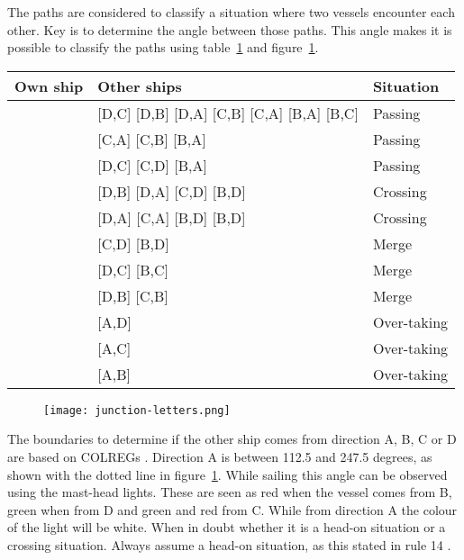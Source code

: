 The paths are considered to classify a situation where two vessels encounter each other. Key is to determine the angle between those paths. This angle makes it is possible to classify the paths using table~\ref{tab:scenarios-standard} and figure~\ref{fig:junction-letters}.

\begin{table}[p]
	\centering
	\begin{tabular}{l|l|l}
		Own ship & Other ships & Situation\\
		\hline
		\big[A,D\big] & [D,C] [D,B] [D,A] [C,B] [C,A] [B,A] [B,C] & Passing \\
		\big[A,C\big] & [C,A] [C,B] [B,A] & Passing \\
		\big[A,B\big] & [D,C] [C,D] [B,A] & Passing \\
		\big[A,C\big] & [D,B] [D,A] [C,D] [B,D] & Crossing \\
		\big[A,B\big] & [D,A] [C,A] [B,D] [B,D] & Crossing \\
		\big[A,D\big] & [C,D] [B,D] & Merge \\
		\big[A,C\big] & [D,C] [B,C] & Merge \\
		\big[A,B\big] & [D,B] [C,B] & Merge \\
		\big[A,D\big] & [A,D] & Over-taking \\
		\big[A,C\big] & [A,C] & Over-taking \\
		\big[A,B\big] & [A,B] & Over-taking \\
	\end{tabular}
	\label{tab:scenarios-standard}
\end{table}

\begin{figure}[p]
	\centering
	\texttt{[image: junction-letters.png]}
	\label{fig:junction-letters}
\end{figure}

The boundaries to determine if the other ship comes from direction A, B, C or D are based on \ac{COLREGs} \cite{IMO1972}. Direction A is between 112.5 and 247.5 degrees, as shown with the dotted line in figure~\ref{fig:junction-letters}. While sailing this angle can be observed using the mast-head lights. These are seen as red when the vessel comes from B, green when from D and green and red from C. While from direction A the colour of the light will be white. When in doubt whether it is a head-on situation or a crossing situation. Always assume a head-on situation, as this stated in rule 14 \cite{IMO1972}.

